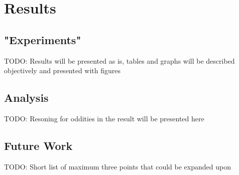 \chapter{Results}\label{cha:results}

\section{"Experiments"}

TODO: Results will be presented as is, tables and graphs will be described objectively and presented with figures

\section{Analysis}

TODO: Resoning for oddities in the result will be presented here

\section{Future Work}\label{sec:futurework}

TODO: Short list of maximum three points that could be expanded upon